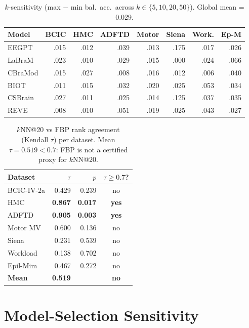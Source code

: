 \documentclass{article}
\begin{document}
\begin{table}[h]
  \caption{$k$-sensitivity (max $-$ min bal.\ acc.\ across $k \in \{5, 10, 20, 50\}$). Global mean = 0.029.}
  \centering\small
  \begin{tabular}{lrrrrrrr}
    \toprule
    Model & BCIC & HMC & ADFTD & Motor & Siena & Work. & Ep-M \\
    \midrule
    EEGPT & .015 & .012 & .039 & .013 & .175 & .017 & .026 \\
    LaBraM & .023 & .010 & .029 & .015 & .000 & .024 & .066 \\
    CBraMod & .015 & .027 & .008 & .016 & .012 & .006 & .040 \\
    BIOT & .011 & .015 & .032 & .020 & .025 & .053 & .034 \\
    CSBrain & .027 & .011 & .025 & .014 & .125 & .037 & .035 \\
    REVE & .008 & .010 & .051 & .019 & .025 & .043 & .027 \\
    \bottomrule
  \end{tabular}
\end{table}

\begin{table}[h]
  \caption{$k$NN@20 vs FBP rank agreement (Kendall $\tau$) per dataset. Mean $\tau = 0.519 < 0.7$: FBP is not a certified proxy for $k$NN@20.}
  \centering\small
  \begin{tabular}{lrrc}
    \toprule
    Dataset & $\tau$ & $p$ & $\tau \geq 0.7$? \\
    \midrule
    BCIC-IV-2a & 0.429 & 0.239 & no \\
    HMC & \textbf{0.867} & \textbf{0.017} & \textbf{yes} \\
    ADFTD & \textbf{0.905} & \textbf{0.003} & \textbf{yes} \\
    Motor MV & 0.600 & 0.136 & no \\
    Siena & 0.231 & 0.539 & no \\
    Workload & 0.138 & 0.702 & no \\
    Epil-Mim & 0.467 & 0.272 & no \\
    \midrule
    \textbf{Mean} & \textbf{0.519} & & \textbf{no} \\
    \bottomrule
  \end{tabular}
\end{table}

\FloatBarrier
\section{Model-Selection Sensitivity}
\label{app:bestval}
\end{document}
